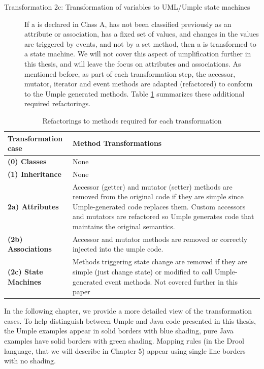 \begin{description}
\begin{description}
\item [Transformation 2c: Transformation of variables to UML/Umple state machines]
If a is declared in Class A, has not been classified previously as an attribute or association, has a fixed set of values, and changes in the values are triggered by events, and not by a set method, then a is transformed to a state machine.	We will not cover this aspect of umplification further in this thesis, and will leave the focus on attributes and associations.
As mentioned before, as part of each transformation step, the accessor, mutator, iterator and event methods are adapted (refactored) to conform to the Umple generated methods. Table \ref{table:transformations} summarizes these additional required refactorings. 
   \end{description}

\end{description}

\begin{table}[htbp]
	\caption{Refactorings to methods required for each transformation}
	\label{table:transformations}
    \centering
    \begin{tabularx}{\textwidth}{| X | X |}
        \toprule
        \rowcolor[HTML]{BBDAFF}
       \textbf{ Transformation case  }   & \textbf{Method Transformations}
        \\ \hline
        \textbf{(0)  Classes }        & None      \\ \hline
        \textbf{(1)  Inheritance}     & None       \\ \hline
        \textbf{2a)  Attributes}      & 
        Accessor (getter) and mutator (setter) methods are removed from the original code 				if they are simple since Umple-generated code replaces them. Custom accessors and 				mutators are refactored so Umple generates code that maintains the original
        semantics.         		\\ \hline
        \textbf{(2b) Associations }   & 
 		Accessor and mutator methods are removed or correctly injected into the umple code.        
		\\ \hline
        \textbf{(2c) State Machines  }  & 
		Methods triggering state change are removed if they are simple (just change state) or 		modified to call Umple-generated event methods. Not covered further in this 					paper       		
\\ \hline
    \end{tabularx}
\end{table}

In the following chapter, we provide a more detailed view of the transformation cases. To help distinguish between Umple and Java code presented in this thesis, the Umple examples appear in solid borders with blue shading, pure Java examples have solid borders with green shading. Mapping rules (in the Drool language, that we will describe in Chapter 5) appear using single line borders with no shading. 